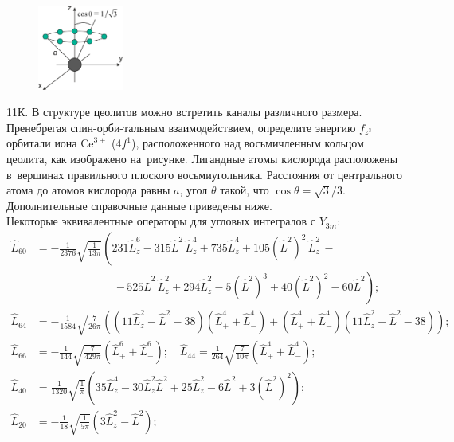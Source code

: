 \begin{figure} %
    \centering
    \vspace{-3.8mm}
    \includegraphics[width=28mm]{images/Fig_2_2_14.png}
    \vspace{-5mm}
\end{figure}
11К. В структуре цеолитов можно встретить каналы различного размера. Пренебрегая спин-орби-тальным взаимодействием, определите энергию $f_{z^3}$ орбитали иона $\text{Ce}^{3+}$ ($4f^1$), расположенного над восьмичленным кольцом цеолита, как изображено на~рисунке. Лигандные атомы кислорода расположены в~вершинах правильного плоского восьмиугольника. Расстояния от центрального атома до атомов кислорода равны $a$, угол $\theta$ такой, что $\cos\theta=\sqrt{3}/3$. Дополнительные справочные данные приведены ниже.
\\
Некоторые эквивалентные операторы для угловых интегралов с $\textit{Y}_{3m}$:
\vspace{0.1mm}
\begin{equation*}
\begin{aligned}
\widehat L_{60} &= -\frac{1}{2376}\sqrt{\frac{1}{13\pi}}\left( 231\widehat L_z^6-315\widehat L^2\,\widehat L_z^4 +735\widehat L_z^4+105({\widehat L^2})^2\,\widehat L_z^2\,- \right.\\[6pt]
&\quad\qquad\qquad\qquad\ \left. -\,525\widehat L^2\,\widehat L^2_z +294\widehat L^2_z - 5 (\widehat L^2)^3 + 40 (\widehat L^2)^2-60 \widehat L^2 \right);
\\[2pt]
 \widehat L_{64} &= -\frac{1}{1584}\sqrt{\frac{7}{26\pi}}\left( (11\widehat L^2_z - \widehat L^2 -38)(\widehat L^4_++\widehat L^4_-)+(\widehat L^4_++\widehat L^4_-)(11\widehat L^2_z - \widehat L^2 -38) \right); 
\\[6pt]
  \widehat L_{66} &= -\frac{1}{144}\sqrt{\frac{7}{429\pi}}\left(\widehat L^6_++\widehat L^6_-\right); \quad  \widehat L_{44} =\frac{1}{264}\sqrt{\frac{7}{10\pi}} \left( \widehat L_+^4 + \widehat L_-^4  \right);
\\[6pt]
\widehat L_{40} &= \frac{1}{1320}\sqrt{\frac{1}{\pi}}\left( 35\widehat L_z^4-30\widehat L_z^2 \widehat L^2+25\widehat L_z^2-6\widehat L^2+3 (\widehat L^2)^2 \right); 
\\[6pt]
\widehat L_{20} &= -\frac{1}{18}\sqrt{\frac{1}{5\pi}}\left(3\widehat L_z^2-\widehat L^2\right);
\end{aligned}
\end{equation*}
